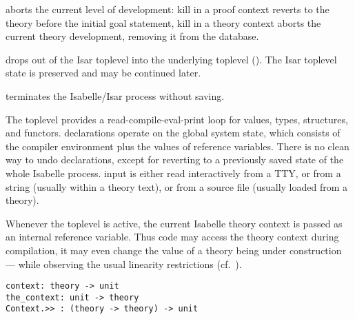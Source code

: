 \begin{isabellebody}
\begin{isamarkuptext}
\begin{description}
  \item {} aborts the current level of development:
  kill in a proof context reverts to the theory before the initial
  goal statement, kill in a theory context aborts the current theory
  development, removing it from the database.

  \item {} drops out of the Isar toplevel into the
  underlying {\ML} toplevel ().  The Isar
  toplevel state is preserved and may be continued later.

  \item {} terminates the Isabelle/Isar process without
  saving.

  \end{description}%
\end{isamarkuptext}%
\isamarkuptrue%
%
\isamarkuptrue%
%
\begin{isamarkuptext}%
The {\ML} toplevel provides a read-compile-eval-print loop for
  {\ML} values, types, structures, and functors.  {\ML} declarations
  operate on the global system state, which consists of the compiler
  environment plus the values of {\ML} reference variables.  There is
  no clean way to undo {\ML} declarations, except for reverting to a
  previously saved state of the whole Isabelle process.  {\ML} input
  is either read interactively from a TTY, or from a string (usually
  within a theory text), or from a source file (usually loaded from a
  theory).

  Whenever the {\ML} toplevel is active, the current Isabelle theory
  context is passed as an internal reference variable.  Thus {\ML}
  code may access the theory context during compilation, it may even
  change the value of a theory being under construction --- while
  observing the usual linearity restrictions
  (cf.~).%
\end{isamarkuptext}%
\isamarkuptrue%
%
\isadelimmlref
%
\endisadelimmlref
%
\isatagmlref
%
\begin{isamarkuptext}%
\begin{mldecls}
  \verb|context: theory -> unit| \\
  \verb|the_context: unit -> theory| \\
  \verb|Context.>> : (theory -> theory) -> unit| \\
  \end{mldecls}


\end{isamarkuptext}
\end{isabellebody}
